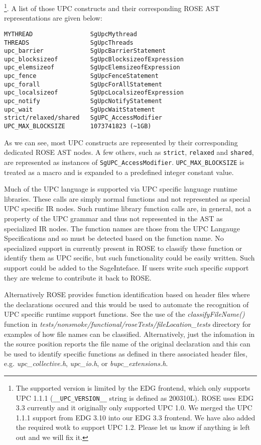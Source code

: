\footnote{
The supported version is limited by the EDG
frontend, which only supports UPC 1.1.1 (\lstinline{__UPC_VERSION__} string
is defined as 200310L).
ROSE uses EDG 3.3 currently and it originally only supported UPC 1.0.
We merged the UPC 1.1.1 support from EDG 3.10 into our EDG 3.3 frontend. 
We have also added the required wotk to support UPC 1.2. Please let us know if anything is
left out and we will fix it.}.
A list of those UPC constructs and their corresponding ROSE AST representations are given below:
\begin{verbatim}
MYTHREAD                SgUpcMythread
THREADS                 SgUpcThreads
upc_barrier             SgUpcBarrierStatement
upc_blocksizeof         SgUpcBlocksizeofExpression
upc_elemsizeof          SgUpcElemsizeofExpression
upc_fence               SgUpcFenceStatement
upc_forall              SgUpcForAllStatement
upc_localsizeof         SgUpcLocalsizeofExpression
upc_notify              SgUpcNotifyStatement
upc_wait                SgUpcWaitStatement
strict/relaxed/shared   SgUPC_AccessModifier
UPC_MAX_BLOCKSIZE       1073741823 (~1GB)
\end{verbatim}
As we can see, most UPC constructs are represented by their corresponding dedicated ROSE AST nodes. 
A few others, such as \lstinline{strict}, \lstinline{relaxed} and
\lstinline{shared}, are represented as instances of \lstinline{SgUPC_AccessModifier}.
\lstinline{UPC_MAX_BLOCKSIZE} is treated as a macro and is expanded to a predefined integer constant value.

Much of the UPC language is supported via UPC specific language runtime
libraries.  These calls are simply normal functions and not represented 
as special UPC specific IR nodes.  
Such runtime library function calls are, in general, 
not a property of the UPC grammar and thus not represented in the AST 
as specialized IR nodes.
The function names are those from the 
UPC Langauge Specifications and so must be detected based on the function
name.  No specialized support in currently present in ROSE to classify 
these function or identify them as UPC secific, but such functionality
could be easily written. Such support could be added to the SageInteface.
If users write such specific support they are welcme to contribute it 
back to ROSE.

Alternatively ROSE provides function identification based on header files
where the declarations occured and this would be used to automate the recognition of UPC 
specific runtime support functions.  See the use of the {\em classifyFileName()}
function in {\em tests/nonsmoke/functional/roseTests/fileLocation\_tests}
directory for examples of how file names can be classified.  Alternatively,
just the infomation in the source position reports the file name of the
original declaration and this can be used to identify specific functions as 
defined in there associated header files, e.g. {\em upc\_collective.h}, 
{\em upc\_io.h}, or {\em bupc\_extensions.h}.

